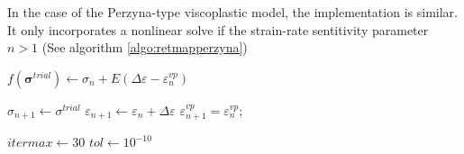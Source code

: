 \documentclass[final,5p,times,twocolumn]{elsarticle}
\begin{document}
In the case of the Perzyna-type viscoplastic model, the implementation is similar. It only incorporates a nonlinear solve if the strain-rate sentitivity parameter $n > 1$ (See algorithm \ref{algo:retmapperzyna})

\begin{algorithm}
  $f(\boldsymbol{\sigma}^{trial}) \gets \sigma_n + E(\Delta\varepsilon - \varepsilon^{vp}_n)$\;
  {
    $\sigma_{n+1} \gets \sigma^{trial}$\;
    $\varepsilon_{n+1} \gets \varepsilon_n + \Delta\varepsilon$\;
    $\varepsilon_{n+1}^{vp}=\varepsilon^{vp}_n$;

  }
  
  \;
  \caption{{\sc $NonLinear\Delta\gamma$} Compute the plastic multiplier value for $n>1$ for the Perzyna-type viscoplastic model}
  \label{algo:retmapperzyna}
\end{algorithm}

\begin{algorithm}
  \KwOut{$\Delta \gamma$}


    $itermax \gets 30$\;
    $tol \gets 10^{-10}$\;

    

  
  \Return{$\Delta \gamma$}\;
  \caption{{$NonLinear\Delta\gamma$} Solve the plastic multiplier increment for the Perzyna-type viscoplastic model for the $n>1$ non-linear case}
  \label{algo:lindgamma}
\end{algorithm}



\end{document}
